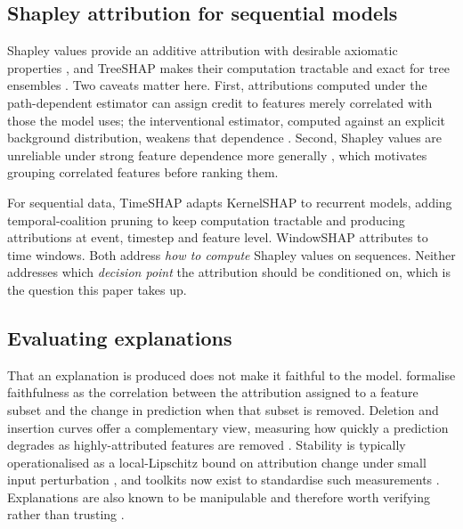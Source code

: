 \documentclass[review,3p,times,authoryear]{elsarticle}   %
\begin{document}
\subsection{Shapley attribution for sequential models}

Shapley values provide an additive attribution with desirable axiomatic properties
\citep{lundberg2017unified}, and TreeSHAP makes their computation tractable and
exact for tree ensembles \citep{lundberg2020local}. Two caveats matter here.
First, attributions computed under the path-dependent estimator can assign credit
to features merely correlated with those the model uses; the interventional
estimator, computed against an explicit background distribution, weakens that
dependence \citep{lundberg2020local}. Second, Shapley values are unreliable under
strong feature dependence more generally \citep{aas2021explaining}, which motivates
grouping correlated features before ranking them.

For sequential data, TimeSHAP \citep{bento2021timeshap} adapts KernelSHAP to
recurrent models, adding temporal-coalition pruning to keep computation tractable
and producing attributions at event, timestep and feature level. WindowSHAP
\citep{nayebi2023windowshap} attributes to time windows. Both address \emph{how to
compute} Shapley values on sequences. Neither addresses which \emph{decision point}
the attribution should be conditioned on, which is the question this paper takes up.

\subsection{Evaluating explanations}

That an explanation is produced does not make it faithful to the model.
\citet{bhatt2020evaluating} formalise faithfulness as the correlation between the
attribution assigned to a feature subset and the change in prediction when that
subset is removed. Deletion and insertion curves offer a complementary view,
measuring how quickly a prediction degrades as highly-attributed features are
removed \citep{petsiuk2018rise}. Stability is typically operationalised as a
local-Lipschitz bound on attribution change under small input perturbation
\citep{alvarezmelis2018robustness}, and toolkits now exist to standardise such
measurements \citep{hedstrom2023quantus}. Explanations are also known to be
manipulable and therefore worth verifying rather than trusting
\citep{slack2020fooling}.
\end{document}

